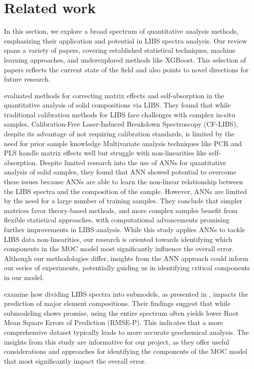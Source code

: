 \section{Related work}\label{sec:related_works}
In this section, we explore a broad spectrum of quantitative analysis methods, emphasizing their application and potential in LIBS spectra analysis. Our review spans a variety of papers, covering established statistical techniques, machine learning approaches, and underexplored methods like XGBoost. This selection of papers reflects the current state of the field and also points to novel directions for future research.

\citeauthor{takahashi_quantitative_2017} evaluated methods for correcting matrix effects and self-absorption in the quantitative analysis of solid compositions via LIBS.
They found that while traditional calibration methods for LIBS face challenges with complex in-situ samples, Calibration-Free Laser-Induced Breakdown Spectroscopy (CF-LIBS), despite its advantage of not requiring calibration standards, is limited by the need for prior sample knowledge\cite{hu_review_2022}
Multivariate analysis techniques like PCR and PLS handle matrix effects well but struggle with non-linearities like self-absorption.
Despite limited research into the use of ANNs for quantitative analysis of solid samples, they found that ANN showed potential to overcome these issues because ANNs are able to learn the non-linear relationship between the LIBS spectra and the composition of the sample.
However, ANNs are limited by the need for a large number of training samples.
They conclude that simpler matrices favor theory-based methods, and more complex samples benefit from flexible statistical approaches, with computational advancements promising further improvements in LIBS analysis\cite{takahashi_quantitative_2017}.
While this study applies ANNs to tackle LIBS data non-linearities, our research is oriented towards identifying which components in the MOC model most significantly influence the overall error. Although our methodologies differ, insights from the ANN approach could inform our series of experiments, potentially guiding us in identifying critical components in our model.

\citeauthor{lepore_quantitative_2022} examine how dividing LIBS spectra into submodels, as presented in \citet{andersonImprovedAccuracyQuantitative2017}, impacts the prediction of major element compositions.
Their findings suggest that while submodeling shows promise, using the entire spectrum often yields lower Root Mean Square Errors of Prediction (RMSE-P). 
This indicates that a more comprehensive dataset typically leads to more accurate geochemical analysis\cite{lepore_quantitative_2022}.
The insights from this study are informative for our project, as they offer useful considerations and approaches for identifying the components of the MOC model that most significantly impact the overall error.


